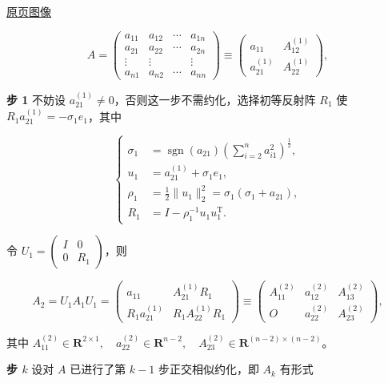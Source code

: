 \documentclass[
  10pt,
  fontset=fandol]{ctexart}
\begin{document}
\href{../../source-images/pdf-246.jpeg}{原页图像}

\[
A=\left(\begin{array}{c|ccc}
a_{11}&a_{12}&\cdots&a_{1n}\\\hline
a_{21}&a_{22}&\cdots&a_{2n}\\
\vdots&\vdots&&\vdots\\
a_{n1}&a_{n2}&\cdots&a_{nn}
\end{array}\right)
\equiv\begin{pmatrix}
a_{11}&A_{12}^{(1)}\\
a_{21}^{(1)}&A_{22}^{(1)}
\end{pmatrix},
\]

\textbf{步 1} 不妨设 \(a_{21}^{(1)}\ne0\)，否则这一步不需约化，选择初等反射阵 \(R_1\) 使 \(R_1a_{21}^{(1)}=-\sigma_1e_1\)，其中

\[
\left\{
\begin{aligned}
\sigma_1&=\operatorname{sgn}(a_{21})\left(\sum_{i=2}^na_{i1}^2\right)^{\frac12},\\
u_1&=a_{21}^{(1)}+\sigma_1e_1,\\
\rho_1&=\frac12\|u_1\|_2^2=\sigma_1(\sigma_1+a_{21}),\\
R_1&=I-\rho_1^{-1}u_1u_1^{\mathrm T}.
\end{aligned}
\right.
\tag{9.3.1}
\]

令 \(U_1=\begin{pmatrix}I&0\\0&R_1\end{pmatrix}\)，则

\[
A_2=U_1A_1U_1=\begin{pmatrix}
a_{11}&A_{21}^{(1)}R_1\\
R_1a_{21}^{(1)}&R_1A_{22}^{(1)}R_1
\end{pmatrix}
\equiv\begin{pmatrix}
A_{11}^{(2)}&a_{12}^{(2)}&A_{13}^{(2)}\\
O&a_{22}^{(2)}&A_{23}^{(2)}
\end{pmatrix},
\]

其中 \(A_{11}^{(2)}\in\mathbf R^{2\times1},\allowbreak \quad a_{22}^{(2)}\in\mathbf R^{n-2},\allowbreak \quad A_{23}^{(2)}\in\mathbf R^{(n-2)\times(n-2)}\)。

\textbf{步 \(k\)} 设对 \(A\) 已进行了第 \(k-1\) 步正交相似约化，即 \(A_k\) 有形式
\end{document}
